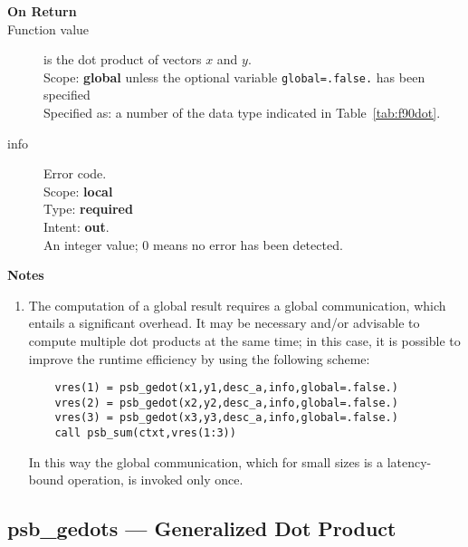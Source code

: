 \begin{description}
\item[\bf On Return] 
\item[Function value] is the dot product of vectors $x$ and $y$.\\
Scope: {\bf global}  unless the optional variable
\verb|global=.false.| has been specified\\
Specified as: a number of the data type indicated in Table~\ref{tab:f90dot}.
\item[info] Error code.\\
Scope: {\bf local} \\
Type: {\bf required} \\
Intent: {\bf out}.\\
An integer value; 0 means no error has been detected. 
\end{description}

{\par\noindent\large\bfseries Notes}
\begin{enumerate}
\item The computation of a global result requires a global
  communication, which entails a significant overhead. It may be
  necessary and/or advisable to compute multiple dot products at the same 
  time; in this case, it is possible to improve the runtime efficiency
  by using the following scheme:
  \begin{lstlisting}
    vres(1) = psb_gedot(x1,y1,desc_a,info,global=.false.)
    vres(2) = psb_gedot(x2,y2,desc_a,info,global=.false.)
    vres(3) = psb_gedot(x3,y3,desc_a,info,global=.false.)
    call psb_sum(ctxt,vres(1:3))
  \end{lstlisting}
  In this way the global communication, which for small sizes is a
  latency-bound operation, is invoked only once.
\end{enumerate}

%
%

\clearpage\subsection{psb\_gedots --- Generalized Dot Product}

